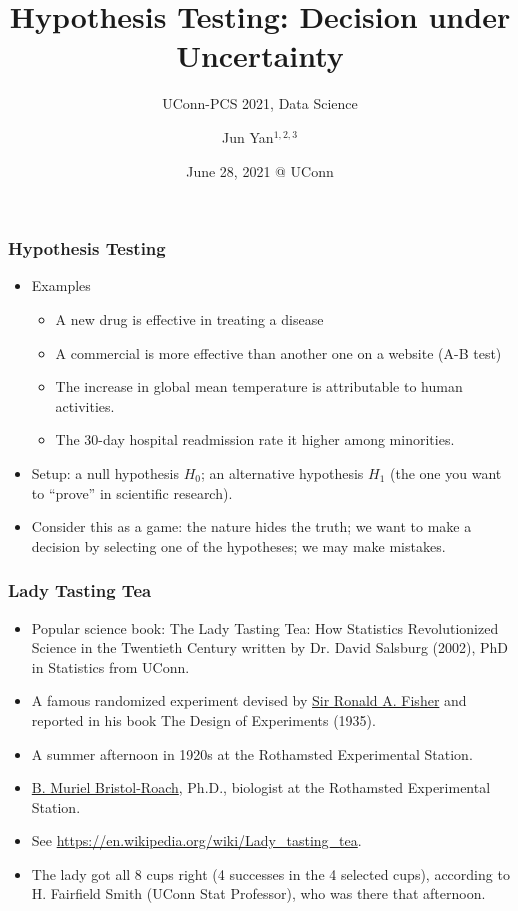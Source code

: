 \documentclass[leqno]{beamer}
\title[Estimation]{
  Hypothesis Testing: Decision under Uncertainty}
\subtitle[]{UConn-PCS 2021, Data Science}
\author[Jun Yan]{Jun Yan$^{1,2,3}$}
\institute[UConn]{
$^{1}$Department of Statistics, University of Connecticut\\
$^{2}$Center for Population Health, UConn Health\\
$^{3}$Center for Environmental Sciences and Engineering, University of Connecticut
}
\date{June 28, 2021 @ UConn}
\begin{document}
\begin{frame}[plain]
\titlepage
\end{frame}


\begin{frame}
  \frametitle{Hypothesis Testing}
  \begin{itemize}
  \item
    Examples
    \begin{itemize}
    \item A new drug is effective in treating a disease
    \item A commercial is more effective than another one on a website
      (A-B test)
    \item The increase in global mean temperature is attributable to
      human activities.
    \item The 30-day hospital readmission rate it higher among
      minorities.
    \end{itemize}
  \item
    Setup: a null hypothesis $H_0$; an alternative hypothesis $H_1$
    (the one you want to ``prove'' in scientific research).
  \item
    Consider this as a game: the nature hides the truth; we want to make a
    decision by selecting one of the hypotheses; we may make mistakes.
  \end{itemize}
\end{frame}


\begin{frame}
  \frametitle{Lady Tasting Tea}
  \begin{itemize}
  \item
    Popular science book: The Lady Tasting Tea: How Statistics
    Revolutionized Science in the Twentieth Century written by
    Dr. David Salsburg (2002), PhD in Statistics from UConn.
  \item
    A famous randomized experiment devised by
    \href{https://en.wikipedia.org/wiki/Ronald_Fisher}{Sir Ronald A. Fisher} and
    reported in his book The Design of Experiments (1935).
  \item
    A summer afternoon in 1920s at the Rothamsted Experimental
    Station.
  \item
    \href{https://en.wikipedia.org/wiki/Muriel_Bristol}{B. Muriel
      Bristol-Roach}, Ph.D., biologist at the Rothamsted Experimental
    Station.
  \item
    See \url{https://en.wikipedia.org/wiki/Lady_tasting_tea}.
  \item
    The lady got all 8 cups right (4 successes in the 4 selected
    cups), according to H. Fairfield Smith (UConn Stat Professor), who
    was there that afternoon.
  \end{itemize}
\end{frame}
\end{document}
